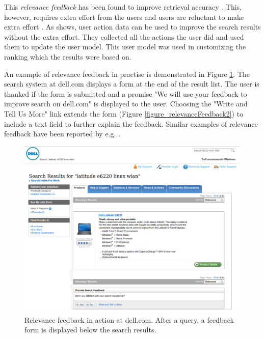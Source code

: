 \documentclass{sigchi}
\begin{document}
This \emph{relevance feedback} has been found to improve retrieval accuracy \cite{salton90}. This, however, requires extra effort from the users and users are reluctant to make extra effort \cite{kelly03}. As \cite{shen05} shows, user action data can be used to improve the search results without the extra effort. They collected all the actions the user did and used them to update the user model. This user model was used in customizing the ranking which the results were based on.

An example of relevance feedback in practise is demonstrated in Figure \ref{figure_relevanceFeedback1}.
The search system at dell.com displays a form at the end of the result list.
The user is thanked if the form is submitted and a promise "We will use your feedback to improve search on dell.com" is displayed to the user.
Choosing the "Write and Tell Us More" link extends the form (Figure \ref{figure_relevanceFeedback2}) to include a text field to further explain the feedback.
Similar examples of relevance feedback have been reported by e.g. \cite{salton90}.

\begin{figure}[htp] %
\caption{Relevance feedback in action at dell.com. After a query, a feedback form is displayed below the search results.\protect} \label{figure_relevanceFeedback1}
\includegraphics[scale=0.28]{figures/relevanceFeedback1.pdf} 
\end{figure}
\end{document}
